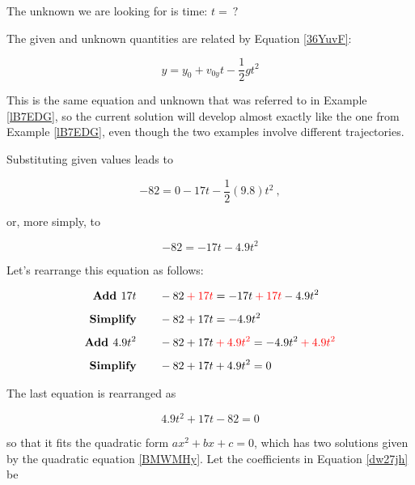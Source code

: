 \documentclass[dvipsnames]{article}
\numberwithin{equation}{section}
\numberwithin{figure}{section}
\begin{document}
\vspace{1em}

The unknown we are looking for is time: $t =\ ?$

\vspace{1em}

The given and unknown quantities are related by Equation \eqref{36YuvF}:

\begin{equation*}
    y = y_0 + v_{0y}t - \frac{1}{2}  g t^2
\end{equation*}

This is the same equation and unknown that was referred to in Example \ref{lB7EDG}, so the current solution will develop almost exactly like the one from Example \ref{lB7EDG}, even though the two examples involve different trajectories.


\vspace{1em}

Substituting given values leads to 

\begin{equation*}
    -82 =  0 - 17 t -\frac{1}{2}(9.8) t^2\ ,
\end{equation*}

or, more simply, to

\begin{equation*}
     -82 = - 17 t -4.9 t^2
\end{equation*}

Let's rearrange this equation as follows:

\begin{align*}
    \textbf{Add $17t$} \qquad & - 82 \mathbin{\color{red} +} \textcolor{red}{17t} = -17t \mathbin{\color{red} +} \textcolor{red}{17t} - 4.9 t^2 \\[1ex]
    \textbf{Simplify} \qquad & -82 + 17t = -4.9t^2\\[1ex]
    \textbf{Add $4.9 t^2$} \qquad & -82 + 17t \mathbin{\color{red} +} \textcolor{red}{4.9 t^2} = -4.9t^2 \mathbin{\color{red} +} \textcolor{red}{4.9 t^2}\\[1ex]
    \textbf{Simplify} \qquad & -82 + 17t + 4.9t^2 = 0
\end{align*}

The last equation is rearranged as 

\begin{equation} \label{dw27jh}
    4.9 t^2 + 17t - 82 = 0
\end{equation}

so that it fits the quadratic form $ax^2 + bx + c = 0$, which has two solutions given by the quadratic equation \eqref{BMWMHy}. Let the coefficients in Equation \eqref{dw27jh} be
\end{document}
